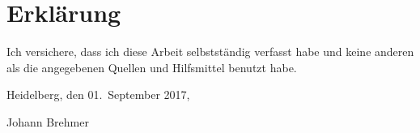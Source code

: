 
\chapter*{Erkl\"{a}rung}
\thispagestyle{empty}

Ich versichere, dass ich diese Arbeit selbstst\"{a}ndig verfasst habe und keine
anderen als die angegebenen Quellen und Hilfsmittel benutzt habe.


\newparagraph
Heidelberg, den 01.\ September 2017,

\vspace{2.5cm}

Johann Brehmer

